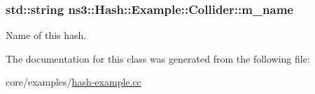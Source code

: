 \subsubsection[{\texorpdfstring{m\+\_\+name}{m_name}}]{\setlength{\rightskip}{0pt plus 5cm}std\+::string ns3\+::\+Hash\+::\+Example\+::\+Collider\+::m\+\_\+name}\hypertarget{classns3_1_1Hash_1_1Example_1_1Collider_a8242a1b153b1e6ab40c37e6c0e6fb05a}{}\label{classns3_1_1Hash_1_1Example_1_1Collider_a8242a1b153b1e6ab40c37e6c0e6fb05a}
Name of this hash. 

The documentation for this class was generated from the following file\+:\begin{DoxyCompactItemize}
\item 
core/examples/\hyperlink{hash-example_8cc}{hash-\/example.\+cc}\end{DoxyCompactItemize}
